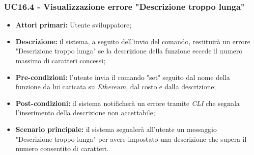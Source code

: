 \subsubsection{UC16.4 - Visualizzazione errore "Descrizione troppo lunga"}
\begin{itemize}
	\item \textbf{Attori primari:} Utente sviluppatore;
	\item \textbf{Descrizione:} il sistema, a seguito dell'invio del comando, restituirà un errore "Descrizione troppo lunga" se la descrizione della funzione eccede il numero massimo di caratteri concessi;
	\item \textbf{Pre-condizioni:}  l'utente invia il comando "set" seguito dal nome della funzione da lui caricata su \textit{Ethereum\glos}, dal costo e dalla descrizione;
	\item \textbf{Post-condizioni:} il sistema notificherà un errore tramite \textit{CLI\glo} che segnala l'inserimento della descrizione non accettabile;
	\item \textbf{Scenario principale:} il sistema segnalerà all'utente un messaggio "Descrizione troppo lunga" per avere impostato una descrizione che supera il numero consentito di caratteri.
\end{itemize}